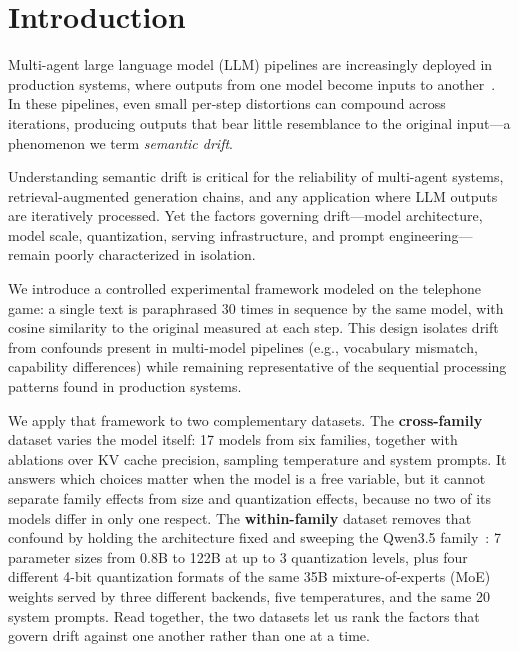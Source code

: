 \documentclass[11pt]{article}
\begin{document}
\section{Introduction}
\label{sec:intro}

Multi-agent large language model (LLM) pipelines are increasingly deployed in
production systems, where outputs from one model become inputs to
another~\citep{rath2026agent}. In these pipelines, even small per-step distortions
can compound across iterations, producing outputs that bear little resemblance
to the original input---a phenomenon we term \emph{semantic drift}.

Understanding semantic drift is critical for the reliability of multi-agent systems,
retrieval-augmented generation chains, and any application where LLM outputs are
iteratively processed. Yet the factors governing drift---model architecture,
model scale, quantization, serving infrastructure, and prompt engineering---remain
poorly characterized in isolation.

We introduce a controlled experimental framework modeled on the telephone game:
a single text is paraphrased 30 times in sequence by the same model, with cosine
similarity to the original measured at each step. This design isolates drift from
confounds present in multi-model pipelines (e.g., vocabulary mismatch, capability
differences) while remaining representative of the sequential processing patterns
found in production systems.

We apply that framework to two complementary datasets. The \textbf{cross-family}
dataset varies the model itself: 17 models from six families, together with
ablations over KV cache precision, sampling temperature and system prompts. It
answers which choices matter when the model is a free variable, but it cannot
separate family effects from size and quantization effects, because no two of its
models differ in only one respect. The \textbf{within-family} dataset removes that
confound by holding the architecture fixed and sweeping the Qwen3.5
family~\citep{qwen2026qwen35}: 7 parameter sizes from 0.8B to 122B at up to 3
quantization levels, plus four different 4-bit quantization formats of the same
35B mixture-of-experts (MoE) weights served by three different backends, five
temperatures, and the same 20 system prompts. Read together, the two datasets let
us rank the factors that govern drift against one another rather than one at a
time.
\end{document}
